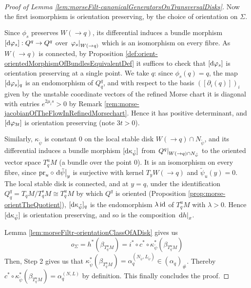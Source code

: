 \begin{proof}[Proof of Lemma \ref{lem:morseFilt-canonicalGeneratorsOnTransversalDisks}]

 
 
 Now the first isomorphism is orientation preserving, by the choice of orientation on $\Sigma$. 

 Since $\phi_s$ preserves $W(\to q)$, its differential induces a bundle morphism $[\mathop{}\!\mathrm{d}\varphi_s]:Q^q\to Q^q$ over $\left.\varphi_s\right|_{W(\to q)}$ which is an isomorphism on every fibre. As $W(\to q)$ is connected, by Proposition \ref{def:orient-orientedMorphismOfBundlesEquivalentDef} it suffices to check that $[\mathop{}\!\mathrm{d}\varphi_s]$ is orientation preserving at a single point. We take $q$: since $\phi_s(q)=q$, the map $[\mathop{}\!\mathrm{d}\varphi_s]_q$ is an endomorphism of $Q^q_q$, and with respect to the basis $([\partial_i(q)])_i$ given by the unstable coordinate vectors of the refined Morse chart it is diagonal with entries $e^{2\mu_is}>0$ by Remark \ref{rem:morse-jacobianOfTheFlowInRefinedMorsechart}. Hence it has positive determinant, and $[\mathop{}\!\mathrm{d}\varphi_{3t}]$ is orientation preserving (note $3t>0$).

 Similarly, $\kappa_{\tilde\psi}$ is constant $0$ on the local stable disk $W(\to q)\cap N_{\tilde\psi}$, and its differential induces a bundle morphism $[\mathop{}\!\mathrm{d}\kappa_{\tilde\psi}]$ from $\left.Q^q\right|_{W(\to q)\cap N_{\tilde\psi}}$ to the oriented vector space $T^u_qM$ (a bundle over the point $0$). It is an isomorphism on every fibre, since $\mathrm{pr}_u\circ\left.\mathop{}\!\mathrm{d}\tilde\psi\right|_{y}$ is surjective with kernel $T_yW(\to q)$ and $\tilde\psi_u(y)=0$. The local stable disk is connected, and at $y=q$, under the identification $Q^q_q=T_qM/T^s_qM\cong T^u_qM$ by which $Q^q$ is oriented (Proposition \ref{prop:morse-orientTheQuotient}), $[\mathop{}\!\mathrm{d}\kappa_{\tilde\psi}]_q$ is the endomorphism $\lambda\operatorname{\mathrm{id}}$ of $T^u_qM$ with $\lambda>0$. Hence $[\mathop{}\!\mathrm{d}\kappa_{\tilde\psi}]$ is orientation preserving, and so is the composition $\left.\mathop{}\!\mathrm{d} h\right|_{x}$. 

 Lemma \ref{lem:morseFiltr-orientationClassOfADisk} gives us 
 \begin{equation*}
	o_\Sigma=h^*(\beta_{T^u_qM})=i^*\circ c^* \circ \kappa_{\tilde{\psi}}^*(\beta_{T^u_qM})
 \end{equation*}
 Then, Step 2 gives us that $\kappa_{\tilde{\psi}}^*(\beta_{T^u_qM})=\alpha_q^{(N_{\tilde{\psi}},L_{\tilde{\psi}})}\in (\alpha_q)_{\#}$. Thereby $c^* \circ \kappa_{\tilde{\psi}}^*(\beta_{T^u_qM})=\alpha_q^{(N,L)}$ by definition. This finally concludes the proof.
\end{proof}



